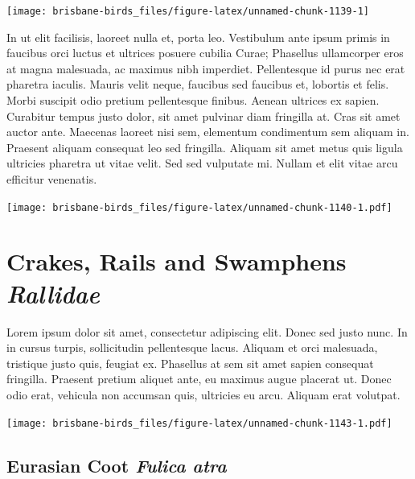 \documentclass[]{book}
\let\origfigure\figure
\let\endorigfigure\endfigure
\renewenvironment{figure}[1][2] {
  \expandafter\origfigure\expandafter[H]
} {
  \endorigfigure
}
\begin{document}
\begin{figure}
\texttt{[image: brisbane-birds\_files/figure-latex/unnamed-chunk-1139-1]} \caption{insert figure caption}\label{fig:unnamed-chunk-1139}
\end{figure}

In ut elit facilisis, laoreet nulla et, porta leo. Vestibulum ante ipsum
primis in faucibus orci luctus et ultrices posuere cubilia Curae;
Phasellus ullamcorper eros at magna malesuada, ac maximus nibh
imperdiet. Pellentesque id purus nec erat pharetra iaculis. Mauris velit
neque, faucibus sed faucibus et, lobortis et felis. Morbi suscipit odio
pretium pellentesque finibus. Aenean ultrices ex sapien. Curabitur
tempus justo dolor, sit amet pulvinar diam fringilla at. Cras sit amet
auctor ante. Maecenas laoreet nisi sem, elementum condimentum sem
aliquam in. Praesent aliquam consequat leo sed fringilla. Aliquam sit
amet metus quis ligula ultricies pharetra ut vitae velit. Sed sed
vulputate mi. Nullam et elit vitae arcu efficitur venenatis.

\begin{figure}
\centering
\texttt{[image: brisbane-birds\_files/figure-latex/unnamed-chunk-1140-1.pdf]}
\caption{\label{fig:unnamed-chunk-1140}insert figure caption}
\end{figure}

\chapter{\texorpdfstring{Crakes, Rails and Swamphens
\emph{Rallidae}}{Crakes, Rails and Swamphens Rallidae}}\label{crakes-rails-and-swamphens-rallidae}

Lorem ipsum dolor sit amet, consectetur adipiscing elit. Donec sed justo
nunc. In in cursus turpis, sollicitudin pellentesque lacus. Aliquam et
orci malesuada, tristique justo quis, feugiat ex. Phasellus at sem sit
amet sapien consequat fringilla. Praesent pretium aliquet ante, eu
maximus augue placerat ut. Donec odio erat, vehicula non accumsan quis,
ultricies eu arcu. Aliquam erat volutpat.

\texttt{[image: brisbane-birds\_files/figure-latex/unnamed-chunk-1143-1.pdf]}

\section{\texorpdfstring{Eurasian Coot \emph{Fulica
atra}}{Eurasian Coot Fulica atra}}\label{eurasian-coot-fulica-atra}
\end{document}
